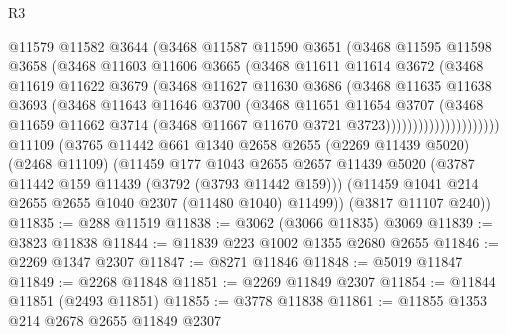 \begin{lexlean}{R3}
\begin{coremodule}
                        @11579
                        @11582
                        @3644
                        (@3468
                          @11587
                          @11590
                          @3651
                          (@3468
                            @11595
                            @11598
                            @3658
                            (@3468
                              @11603
                              @11606
                              @3665
                              (@3468
                                @11611
                                @11614
                                @3672
                                (@3468
                                  @11619
                                  @11622
                                  @3679
                                  (@3468
                                    @11627
                                    @11630
                                    @3686
                                    (@3468
                                      @11635
                                      @11638
                                      @3693
                                      (@3468
                                        @11643
                                        @11646
                                        @3700
                                        (@3468
                                          @11651
                                          @11654
                                          @3707
                                          (@3468
                                            @11659
                                            @11662
                                            @3714
                                            (@3468 @11667 @11670 @3721 @3723)))))))))))))))))))))
    @11109
    (@3765
      @11442
      @661
      @1340
      @2658
      @2655
      (@2269 @11439 @5020)
      (@2468 @11109)
      (@11459
        @177
        @1043
        @2655
        @2657
        @11439
        @5020
        (@3787 @11442 @159 @11439 (@3792 (@3793 @11442 @159)))
        (@11459 @1041 @214 @2655 @2655 @1040 @2307 (@11480 @1040) @11499))
      (@3817 @11107 @240))
@11835 := @288 @11519
@11838 := @3062 (@3066 @11835) @3069
@11839 := @3823 @11838
@11844 := @11839 @223 @1002 @1355 @2680 @2655
@11846 := @2269 @1347 @2307
@11847 := @8271 @11846
@11848 := @5019 @11847
@11849 := @2268 @11848
@11851 := @2269 @11849 @2307
@11854 := @11844 @11851 (@2493 @11851)
@11855 := @3778 @11838
@11861 := @11855 @1353 @214 @2678 @2655 @11849 @2307

\end{coremodule}
\end{lexlean}
